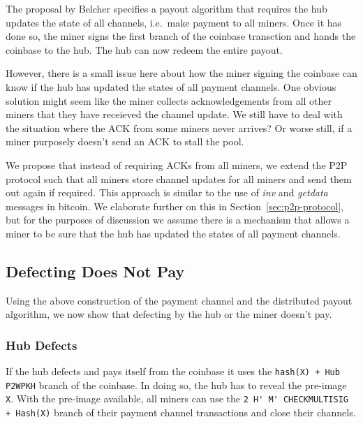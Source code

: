 \documentclass{article}
\begin{document}
The proposal by Belcher specifies a payout algorithm that requires the
hub updates the state of all channels, i.e.\ make payment to all
miners. Once it has done so, the miner signs the first branch of the
coinbase transction and hands the coinbase to the hub. The hub can now
redeem the entire payout.

However, there is a small issue here about how the miner signing the
coinbase can know if the hub has updated the states of all payment
channels. One obvious solution might seem like the miner collects
acknowledgements from all other miners that they have receieved the
channel update. We still have to deal with the situation where the ACK
from some miners never arrives? Or worse still, if a miner purposely
doesn't send an ACK to stall the pool.

We propose that instead of requiring ACKs from all miners, we extend
the P2P protocol such that all miners store channel updates for all
miners and send them out again if required. This approach is similar
to the use of \emph{inv} and \emph{getdata} messages in bitcoin. We
elaborate further on this in Section~\ref{sec:p2p-protocol}, but for
the purposes of discussion we assume there is a mechanism that allows
a miner to be sure that the hub has updated the states of all payment
channels.




\subsection{Defecting Does Not Pay}\label{ref:defecting}

Using the above construction of the payment channel and the
distributed payout algorithm, we now show that defecting by the hub or
the miner doesn't pay.

\subsubsection{Hub Defects}\label{ref:hub-defects}

If the hub defects and pays itself from the coinbase it uses the
\verb|hash(X) + Hub P2WPKH| branch of the coinbase. In doing so, the
hub has to reveal the pre-image \verb|X|. With the pre-image
available, all miners can use the
\verb|2 H' M' CHECKMULTISIG + Hash(X)| branch of their payment channel
transactions and close their channels.
\end{document}
